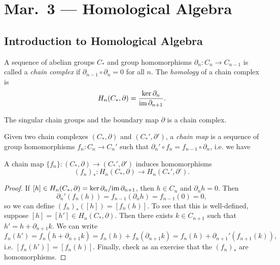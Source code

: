 \chapter{Mar.~3 --- Homological Algebra}

\section{Introduction to Homological Algebra}

\begin{definition}
  A sequence of abelian groups $C_*$ and group
  homomorphisms
  $\partial_n : C_n \to C_{n - 1}$ is called a
  \emph{chain complex} if $\partial_{n - 1} \circ \partial_n = 0$
  for all $n$. The \emph{homology} of a chain
  complex is
  \[
    H_n(C_*, \partial) = \frac{\ker \partial_n}{\operatorname{im} \partial_{n + 1}}.
  \]
\end{definition}

\begin{example}
  The singular chain groups and the boundary
  map $\partial$ is a chain complex.
\end{example}

\begin{definition}
  Given two chain complexes $(C_*, \partial)$ and
  $(C_*', \partial')$, a \emph{chain map} is a
  sequence of group homomorphisms $f_n : C_n \to C_n'$
  such that $\partial_n' \circ f_n = f_{n - 1} \circ \partial_{n}$, i.e. we have
  \begin{center}
  \end{center}
\end{definition}

\begin{lemma}\label{lemma:chain-map-induced}
  A chain map $\{f_n\} : (C_*, \partial) \to (C_*', \partial')$
  induces homomorphisms
  \[(f_n)_* : H_n(C_*, \partial) \to H_n(C_*', \partial').\]
\end{lemma}

\begin{proof}
  If $[h] \in H_n(C_*, \partial) = \ker \partial_n / {\operatorname{im} \partial_{n + 1}}$,
  then $h \in C_n$ and $\partial_n h = 0$. Then
  \[
    \partial_n'(f_n(h)) = f_{n - 1}(\partial_n h) = f_{n - 1}(0) = 0,
  \]
  so we can define $(f_n)_*([h]) = [f_n(h)]$.
  To see that this is well-defined, suppose
  $[h] = [h'] \in H_n(C_*, \partial)$. Then
  there exists $k \in C_{n + 1}$ such that
  $h' = h + \partial_{n + 1} k$. We can write
  \[
    f_n(h')
    = f_n(h + \partial_{n + 1} k)
    = f_n(h) + f_n(\partial_{n + 1} k)
    = f_n(h) + \partial_{n + 1}'(f_{n + 1}(k)),
  \]
  i.e. $[f_n(h')] = [f_n(h)]$. Finally,
  check as an exercise that
  the $(f_n)_*$ are homomorphisms.
\end{proof}

